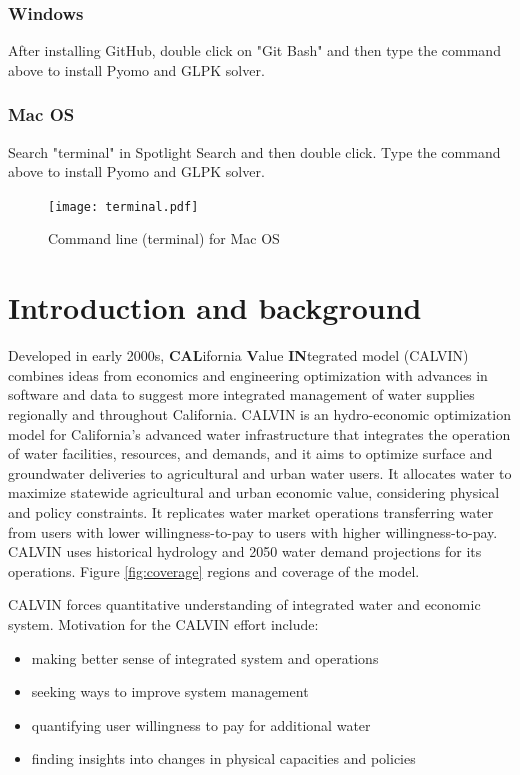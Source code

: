 \documentclass[12pt]{article}%
\begin{document}
\subsubsection{Windows}
%
After installing GitHub, double click on "Git Bash" and then type the command above to install Pyomo and GLPK solver.
\subsubsection{Mac OS}
%
Search "terminal" in Spotlight Search and then double click. Type the command above to install Pyomo and GLPK solver.
\begin{figure}[H]
		\centering
    		\texttt{[image: terminal.pdf]}
   		\caption{Command line (terminal) for Mac OS}
    		\label{fig:terminal}
	\end{figure}
%
\pagebreak
%
\section{Introduction and background}
%
Developed in early 2000s, {\bf CAL}ifornia {\bf V}alue {\bf IN}tegrated model (CALVIN) combines ideas from economics and engineering optimization with advances in software and data to suggest more integrated management of water supplies regionally and throughout California. CALVIN is an hydro-economic optimization model for California's advanced water infrastructure that integrates the operation of water facilities, resources, and demands, and it aims to optimize surface and groundwater deliveries to agricultural and urban water users. It allocates water to maximize statewide agricultural and urban economic value, considering physical and policy constraints. It replicates water market operations transferring water from users with lower willingness-to-pay to users with higher willingness-to-pay. CALVIN uses historical hydrology and 2050 water demand projections for its operations. Figure \ref{fig:coverage} regions and coverage of the model. \\
\par CALVIN forces quantitative understanding of integrated water and economic system. Motivation for the CALVIN effort include:
\begin{itemize}
	\item making better sense of integrated system and operations
	\item seeking ways to improve system management
	\item quantifying user willingness to pay for additional water
	\item finding insights into changes in physical capacities and policies
\end{itemize}
\end{document}

